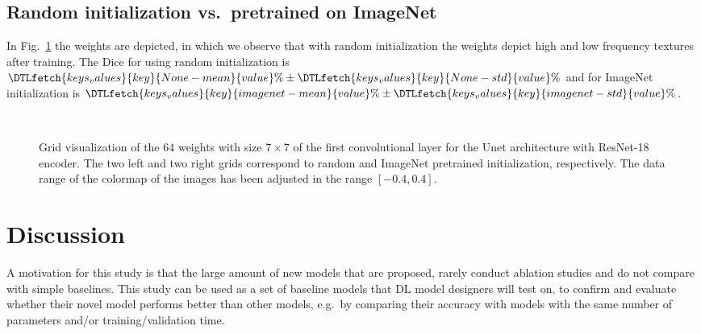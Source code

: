 \documentclass{elsarticle}
\begin{document}
\subsection{Random initialization vs.\ pretrained on ImageNet}
In Fig.~\ref{fig:weights} the weights are depicted, in which we observe that with random initialization the weights depict high and low frequency textures after training.
The Dice for using random initialization is $\DTLfetch{keys_values}{key}{None-mean}{value}\%\pm\DTLfetch{keys_values}{key}{None-std}{value}\%$ and for ImageNet initialization is $\DTLfetch{keys_values}{key}{imagenet-mean}{value}\%\pm\DTLfetch{keys_values}{key}{imagenet-std}{value}\%$.

\begin{figure}[!t]
	\centering
	\\
	\setcounter{subfigure}{0}
	\caption{Grid visualization of the $64$ weights with size $7\times 7$ of the first convolutional layer for the Unet architecture with ResNet-18 encoder.
	The two left and two right grids correspond to random and ImageNet pretrained initialization, respectively.
	The data range of the colormap of the images has been adjusted in the range $[-0.4, 0.4]$.}
	\label{fig:weights}
\end{figure}

\section{Discussion}
\label{sec:discussion}
A motivation for this study is that the large amount of new models that are proposed, rarely conduct ablation studies and do not compare with simple baselines.
This study can be used as a set of baseline models that DL model designers will test on, to confirm and evaluate whether their novel model performs better than other models, e.g.\ by comparing their accuracy with models with the same number of parameters and/or training/validation time.
\end{document}
